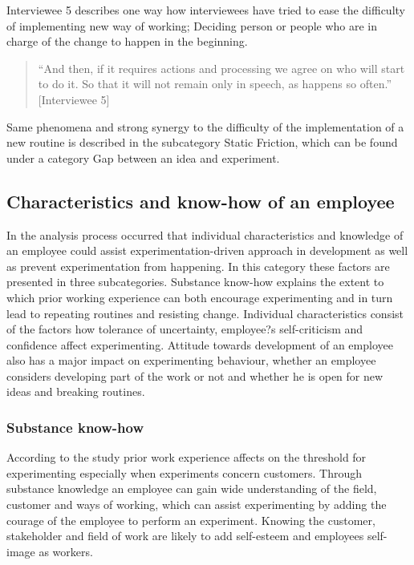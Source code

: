Interviewee 5 describes one way how interviewees have tried to ease the difficulty of implementing new way of working; Deciding person or people who are in charge of the change to happen in the beginning. 
\begin{quote}
``And then, if it requires actions and processing we agree on who will start to do it. So that it will not remain only in speech, as happens so often.'' [Interviewee 5]
\end{quote}
Same phenomena and strong synergy to the difficulty of the implementation of a new routine is described in the subcategory Static Friction, which can be found under a category Gap between an idea and experiment. 

\subsection{Characteristics and know-how of an employee}
In the analysis process occurred that individual characteristics and knowledge of an employee could assist experimentation-driven approach in development as well as prevent experimentation from happening. In this category these factors are presented in three subcategories. Substance know-how explains the extent to which prior working experience can both encourage experimenting and in turn lead to repeating routines and resisting change. Individual characteristics consist of the factors how tolerance of uncertainty, employee?s self-criticism and confidence affect experimenting. Attitude towards development of an employee also has a major impact on experimenting behaviour, whether an employee considers developing part of the work or not and whether he is open for new ideas and breaking routines. 

\subsubsection{Substance know-how}
According to the study prior work experience affects on the threshold for experimenting especially when experiments concern customers. Through substance knowledge an employee can gain wide understanding of the field, customer and ways of working, which can assist experimenting by adding the courage of the employee to perform an experiment. Knowing the customer, stakeholder and field of work are likely to add self-esteem and employees self-image as workers. 

